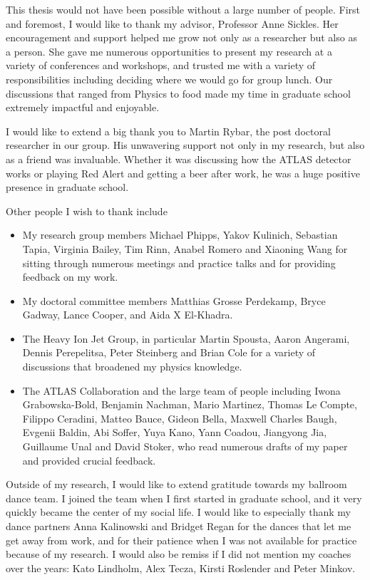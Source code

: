 
This thesis would not have been possible without a large number of people.
First and foremost, I would like to thank my advisor, Professor Anne Sickles.
Her encouragement and support helped me grow not only as a researcher but also as a person.
She gave me numerous opportunities to present my research at a variety of conferences and workshops, and trusted me with a variety of responsibilities including deciding where we would go for group lunch.
Our discussions that ranged from Physics to food made my time in graduate school extremely impactful and enjoyable. 

I would like to extend a big thank you to Martin Rybar, the post doctoral researcher in our group.
His unwavering support not only in my research, but also as a friend was invaluable.
Whether it was discussing how the ATLAS detector works or playing Red Alert and getting a beer after work, he was a huge positive presence in graduate school.

Other people I wish to thank include
\begin{itemize}
\item My research group members Michael Phipps, Yakov Kulinich, Sebastian Tapia, Virginia Bailey, Tim Rinn, Anabel Romero and Xiaoning Wang for sitting through numerous meetings and practice talks and for providing feedback on my work.

\item My doctoral committee members Matthias Grosse Perdekamp, Bryce Gadway, Lance Cooper, and Aida X El-Khadra.

\item The Heavy Ion Jet Group, in particular Martin Spousta, Aaron Angerami, Dennis Perepelitsa, Peter Steinberg and Brian Cole for a variety of discussions that broadened my physics knowledge.

\item The ATLAS Collaboration and the large team of people including Iwona Grabowska-Bold, Benjamin Nachman, Mario Martinez, Thomas Le Compte, Filippo Ceradini, Matteo Bauce, Gideon Bella, Maxwell Charles Baugh, Evgenii Baldin, Abi Soffer, Yuya Kano, Yann Coadou, Jiangyong Jia, Guillaume Unal and David Stoker, who read numerous drafts of my paper and provided crucial feedback.
\end{itemize}


Outside of my research, I would like to extend gratitude towards my ballroom dance team.
I joined the team when I first started in graduate school, and it very quickly became the center of my social life.
I would like to especially thank my dance partners Anna Kalinowski and Bridget Regan for the dances that let me get away from work, and for their patience when I was not available for practice because of my research.
I would also be remiss if I did not mention my coaches over the years: Kato Lindholm, Alex Tecza, Kirsti Roslender and Peter Minkov.

